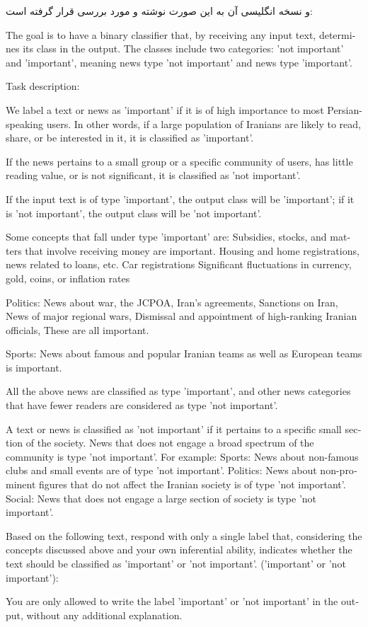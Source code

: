 و نسخه انگلیسی آن به این صورت نوشته و مورد بررسی قرار گرفته است:

\vspace{5pt}
\begin{scriptsize}
\begin{itshape}
\begin{latin}
\LTR
The goal is to have a binary classifier that, by receiving any input text, determines its class in the output. The classes include two categories: 'not important' and 'important', meaning news type 'not important' and news type 'important'.

Task description:

We label a text or news as 'important' if it is of high importance to most Persian-speaking users. In other words, if a large population of Iranians are likely to read, share, or be interested in it, it is classified as 'important'.

If the news pertains to a small group or a specific community of users, has little reading value, or is not significant, it is classified as 'not important'.

If the input text is of type 'important', the output class will be 'important'; if it is 'not important', the output class will be 'not important'.

Some concepts that fall under type 'important' are:
Subsidies, stocks, and matters that involve receiving money are important.
Housing and home registrations, news related to loans, etc.
Car registrations
Significant fluctuations in currency, gold, coins, or inflation rates

Politics:
News about war, the JCPOA, Iran’s agreements,
Sanctions on Iran,
News of major regional wars,
Dismissal and appointment of high-ranking Iranian officials,
These are all important.

Sports:
News about famous and popular Iranian teams as well as European teams is important.

All the above news are classified as type 'important', and other news categories that have fewer readers are considered as type 'not important'.

A text or news is classified as 'not important' if it pertains to a specific small section of the society. News that does not engage a broad spectrum of the community is type 'not important'. For example:
Sports: News about non-famous clubs and small events are of type 'not important'.
Politics: News about non-prominent figures that do not affect the Iranian society is of type 'not important'.
Social: News that does not engage a large section of society is type 'not important'.

Based on the following text, respond with only a single label that, considering the concepts discussed above and your own inferential ability, indicates whether the text should be classified as 'important' or 'not important'. ('important' or 'not important'):

You are only allowed to write the label 'important' or 'not important' in the output, without any additional explanation.
\RTL
\end{latin}
\end{itshape}
\end{scriptsize}
